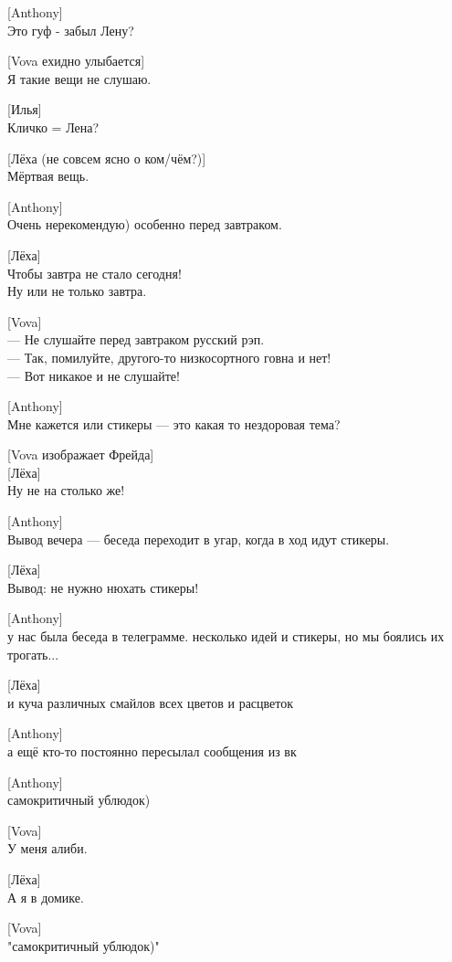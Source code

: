 [Anthony]\\
Это гуф - забыл Лену?


[Vova ехидно улыбается]\\
Я такие вещи не слушаю.


[Илья]\\
Кличко = Лена?


[Лёха (не совсем ясно о ком/чём?)]\\
Мёртвая вещь.


[Anthony]\\
Очень нерекомендую) особенно перед завтраком.


[Лёха]\\
Чтобы завтра не стало сегодня!\\
Ну или не только завтра.


[Vova]\\
— Не слушайте перед завтраком русский рэп.\\
— Так, помилуйте, другого-то низкосортного говна и нет!\\
— Вот никакое и не слушайте!


[Anthony]\\
Мне кажется или стикеры --- это какая то нездоровая тема?


[Vova изображает Фрейда]\\


[Лёха]\\
Ну не на столько же!


[Anthony]\\
Вывод вечера --- беседа переходит в угар, когда в ход идут стикеры.


[Лёха]\\
Вывод: не нужно нюхать стикеры!


[Anthony]\\
у нас была беседа в телеграмме. несколько идей и стикеры, но мы боялись их трогать...


[Лёха]\\
и куча различных смайлов всех цветов и расцветок


[Anthony]\\
а ещё кто-то постоянно пересылал сообщения из вк


[Anthony]\\
самокритичный ублюдок)


[Vova]\\
У меня алиби.


[Лёха]\\
А я в домике.


[Vova]\\
"самокритичный ублюдок)"



